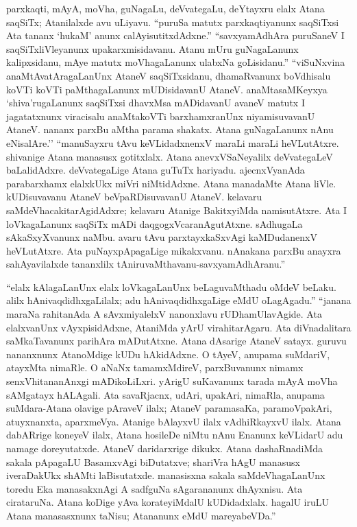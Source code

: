 parxkaqti, mAyA, moVha, guNagaLu, deVvategaLu, deYtayxru elalx Atana saqSiTx; Atanilalxde avu uLiyavu. ``puruSa matutx parxkaqtiyanunx saqSiTxsi Ata tananx `hukaM' anunx calAyisutitxdAdxne.'' ``savxyamAdhAra puruSaneV I saqSiTxliVleyanunx upakarxmisidavanu. Atanu mUru guNagaLanunx kalipxsidanu, mAye matutx moVhagaLanunx ulabxNa goLisidanu.'' ``viSuNxvina anaMtAvatAragaLanUnx AtaneV saqSiTxsidanu, dhamaRvanunx boVdhisalu koVTi koVTi paMthagaLanunx mUDisidavanU AtaneV. anaMtasaMKeyxya `shiva'rugaLanunx saqSiTxsi dhavxMsa mADidavanU avaneV matutx I jagatatxnunx viracisalu anaMtakoVTi barxhamxranUnx niyamisuvavanU AtaneV. nananx parxBu aMtha parama shakatx. Atana guNagaLanunx nAnu eNisalAre.'' ``manuSayxru tAvu keVLidadxnenxV maraLi maraLi heVLutAtxre. shivanige Atana manasusx gotitxlalx. Atana anevxVSaNeyalilx deVvategaLeV baLalidAdxre. deVvategaLige Atana guTuTx hariyadu. ajecnxVyanAda parabarxhamx elalxkUkx miVri niMtidAdxne. Atana manadaMte Atana liVle. kUDisuvavanu AtaneV beVpaRDisuvavanU AtaneV. kelavaru saMdeVhacakitarAgidAdxre; kelavaru Atanige BakitxyiMda namisutAtxre. Ata I loVkagaLanunx  saqSiTx mADi daqgogxVcaranAgutAtxne. sAdhugaLa sAkaSxyXvanunx naMbu. avaru tAvu parxtayxkaSxvAgi kaMDudanenxV heVLutAtxre. Ata puNayxpApagaLige mikakxvanu. nAnakana parxBu anayxra sahAyavilalxde tananxlilx tAniruvaMthavanu-savxyamAdhAranu.''

\newpage

``elalx kAlagaLanUnx elalx loVkagaLanUnx beLaguvaMthadu oMdeV beLaku. alilx hAnivaqdidhxgaLilalx; adu hAnivaqdidhxgaLige eMdU oLagAgadu.'' ``janana maraNa rahitanAda A sAvxmiyalelxV nanonxlavu rUDhamUlavAgide. Ata elalxvanUnx vAyxpisidAdxne, AtaniMda yArU virahitarAgaru. Ata diVnadalitara saMkaTavanunx parihAra mADutAtxne. Atana dAsarige AtaneV satayx. guruvu nananxnunx AtanoMdige kUDu hAkidAdxne. O tAyeV, anupama suMdariV, atayxMta nimaRle. O aNaNx tamamxMdireV, parxBuvanunx nimamx senxVhitananAnxgi mADikoLiLxri. yArigU suKavanunx tarada mAyA moVha sAMgatayx hALAgali. Ata savaRjacnx, udAri, upakAri, nimaRla, anupama suMdara-Atana olavige pAraveV ilalx; AtaneV paramasaKa, paramoVpakAri, atuyxnanxta, aparxmeVya. Atanige bAlayxvU ilalx vAdhiRkayxvU ilalx. Atana dabARrige koneyeV ilalx, Atana hosileDe niMtu nAnu Enanunx keVLidarU adu namage doreyutatxde. AtaneV daridarxrige dikukx. Atana dashaRnadiMda sakala pApagaLU BasamxvAgi biDutatxve; shariVra hAgU manasusx iveraDakUkx shAMti laBisutatxde. manasisxna sakala saMdeVhagaLanUnx toredu Eka manasakxnAgi A sadfguNa sAgarananunx dhAyxnisu. Ata cirataruNa. Atana koDige yAva korateyiMdalU kUDidadxlalx. hagalU iruLU Atana manasasxnunx taNisu; Atananunx eMdU mareyabeVDa.''

